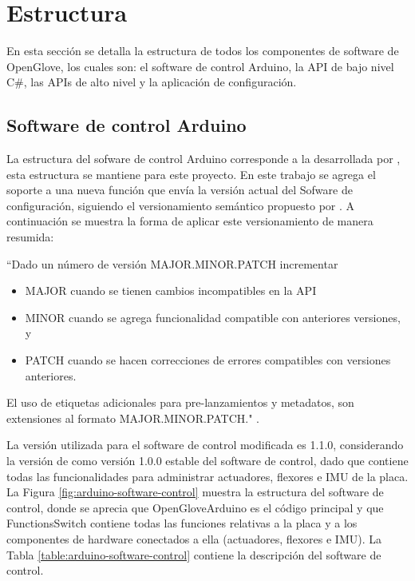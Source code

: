 \section{Estructura}
En esta sección se detalla la estructura de todos los componentes de software de OpenGlove, los cuales son: el software de control Arduino, la API de bajo nivel C\#, las APIs de alto nivel  y la aplicación de configuración.





\subsection{Software de control Arduino}
La estructura del sofware de control Arduino corresponde a la desarrollada por \cite{tesis-cerda-rodrigo}, esta estructura se mantiene para este proyecto. En este trabajo se agrega el soporte a una nueva función que envía la versión actual del Sofware de configuración, siguiendo el versionamiento semántico propuesto por \cite{semantic-versioning-tom-preston-werner-coFounder-GitHub}. A continuación se muestra la forma de aplicar este versionamiento de manera resumida:

``Dado un número de versión MAJOR.MINOR.PATCH incrementar
\begin{itemize}
\item MAJOR cuando se tienen cambios incompatibles en la API
\item MINOR cuando se agrega funcionalidad compatible con anteriores versiones, y
\item PATCH cuando se hacen correcciones de errores compatibles con versiones anteriores.
\end{itemize}
El uso de etiquetas adicionales para pre-lanzamientos y metadatos, son extensiones al formato MAJOR.MINOR.PATCH." \citep{semantic-versioning-tom-preston-werner-coFounder-GitHub}. 

La versión utilizada para el software de control modificada es 1.1.0, considerando la versión de \cite{tesis-cerda-rodrigo} como versión 1.0.0 estable del software de control, dado que contiene todas las funcionalidades para administrar actuadores, flexores e IMU de la placa. La Figura \ref{fig:arduino-software-control} muestra la estructura del software de control, donde se aprecia que OpenGloveArduino es el código principal y que FunctionsSwitch contiene todas las funciones relativas a la placa y a los componentes de hardware conectados a ella (actuadores, flexores e IMU). La Tabla \ref{table:arduino-software-control} contiene la descripción del software de control.

